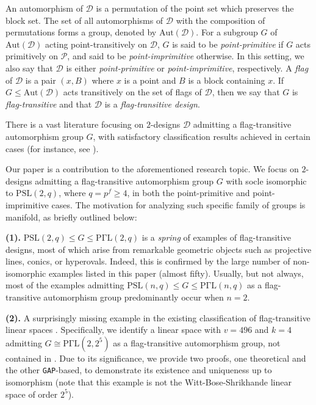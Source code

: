 \documentclass[a4paper,twopage,reqno,12pt]{amsart}
\theoremstyle{definition}
\numberwithin{equation}{section}
\newcommand{\PSL}{\mathrm{PSL}}
\newcommand{\PGaL}{\mathrm{P\Gamma L}}
\renewcommand{\leq}{\leqslant}
\renewcommand{\geq}{\geqslant}
\begin{document}
An automorphism of $\mathcal{D}$ is a permutation of the point set which preserves the block
set. The set of all automorphisms of $\mathcal{D}$ with the composition of
permutations forms a group, denoted by $\mathrm{Aut(\mathcal{D})}$. For a
subgroup $G$ of $\mathrm{Aut(\mathcal{D})}$ acting point-transitively on $\mathcal{D}$, $G$ is said to be \emph{%
point-primitive} if $G$ acts primitively on $\mathcal{P}$, and said to be 
\emph{point-imprimitive} otherwise. In this setting, we also say that $%
\mathcal{D}$ is either \emph{point-primitive} or \emph{point-imprimitive}, respectively. A \emph{flag} of $\mathcal{D}$ is a pair $(x,B)$ where $x$ is
a point and $B$ is a block containing $x$. If $G\leq \mathrm{Aut(\mathcal{D})%
}$ acts transitively on the set of flags of $\mathcal{D}$, then we say that $%
G$ is \emph{flag-transitive} and that $\mathcal{D}$ is a \emph{flag-transitive design}.

There is a vast literature focusing on $2$-designs $\mathcal{D}$ admitting a
flag-transitive automorphism group $G$, with satisfactory classification results achieved 
in certain cases (for instance, see \cite{BDDKLS,United,DP,LM,MS,Mo,GM}).

Our paper is a contribution to the aforementioned research topic. We focus on $2$-designs admitting a flag-transitive automorphism group $G$ with socle isomorphic to $\PSL(2,q)$, where $q=p^{f}\geq 4$, in both the point-primitive and point-imprimitive cases. 
The motivation for analyzing such specific family of groups is manifold, as briefly outlined below:

\noindent \textbf{(1).} $\PSL(2,q) \leq G \leq \PGaL(2,q)$ is a \emph{spring} of examples of flag-transitive designs, most of which arise from remarkable geometric objects such as projective lines, conics, or hyperovals. Indeed, this is confirmed by the large number of non-isomorphic examples listed in this paper (almost fifty). Usually, but not always, most of the examples admitting $\PSL(n,q) \leq G \leq \PGaL(n,q)$ as a flag-transitive automorphism group predominantly occur when $n=2$.

\noindent \textbf{(2).} A surprisingly missing example in the existing classification of flag-transitive linear spaces
\cite{BDDKLS, Saxl,De}. Specifically, we identify a linear space with $v=496$ and $k=4$ admitting $G\cong \PGaL(2,2^{5})$ as a flag-transitive automorphism group, not contained in \cite{BDDKLS, Saxl,De}. Due to its significance, we provide two proofs, one theoretical and the other \texttt{GAP}-based, to demonstrate its existence and uniqueness up to isomorphism (note that this example is not the Witt-Bose-Shrikhande linear space of order $2^{5}$). 
\end{document}
